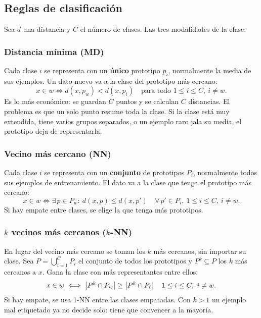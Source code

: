 \documentclass[11pt,letterpaper]{article}
\begin{document}

\subsection*{Reglas de clasificación}

Sea $d$ una distancia y $C$ el número de clases. Las tres modalidades
de la clase:

\subsubsection*{Distancia mínima (MD)}

Cada clase $i$ se representa con un \textbf{único} prototipo $p_i$,
normalmente la media de sus ejemplos. Un dato nuevo va a la clase
del prototipo más cercano:
\[
    x \in w \iff d(x, p_w) < d(x, p_i)
    \quad \text{para todo } 1 \leq i \leq C,\ i \neq w .
\]
Es lo más económico: se guardan $C$ puntos y se calculan $C$
distancias. El problema es que un solo punto resume toda la clase. Si
la clase está muy extendida, tiene varios grupos separados, o un
ejemplo raro jala su media, el prototipo deja de representarla.

\subsubsection*{Vecino más cercano (NN)}

Cada clase $i$ se representa con un \textbf{conjunto} de prototipos
$P_i$, normalmente todos sus ejemplos de entrenamiento. El dato va a
la clase que tenga el prototipo más cercano:
\[
    x \in w \iff \exists\, p \in P_w :\ d(x, p) \leq d(x, p')
    \quad \forall\, p' \in P_i,\ 1 \leq i \leq C,\ i \neq w .
\]
Si hay empate entre clases, se elige la que tenga más prototipos.

\subsubsection*{$k$ vecinos más cercanos ($k$-NN)}

En lugar del vecino más cercano se toman los $k$ más cercanos, sin
importar su clase. Sea $P = \bigcup_{i=1}^{C} P_i$ el conjunto de todos
los prototipos y $P^k \subseteq P$ los $k$ más cercanos a $x$. Gana la
clase con más representantes entre ellos:
\[
    x \in w \iff \left\lvert P^k \cap P_w \right\rvert \geq \left\lvert P^k \cap P_i \right\rvert
    \quad 1 \leq i \leq C,\ i \neq w .
\]
Si hay empate, se usa 1-NN entre las clases empatadas. Con $k > 1$ un
ejemplo mal etiquetado ya no decide solo: tiene que convencer a la
mayoría.
\end{document}
